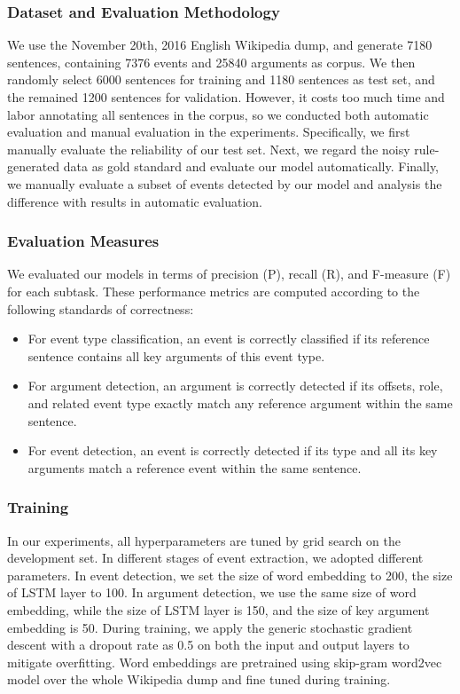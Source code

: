 \documentclass{article}
\begin{document}
\subsubsection{Dataset and Evaluation Methodology}
We use the November 20th, 2016 English Wikipedia dump, and generate 7180 sentences, containing 7376 events and 25840 arguments as corpus. We then randomly select 6000 sentences for training and 1180 sentences as test set, and the remained 1200 sentences for validation. However, it costs too much time and labor annotating all sentences in the corpus, so we conducted both automatic evaluation and manual evaluation in the experiments. Specifically, we first manually evaluate the reliability of our test set. Next, we regard the noisy rule-generated data as gold standard and evaluate our model automatically. Finally, we manually evaluate a subset of events detected by our model and analysis the difference with results in automatic evaluation.

\subsubsection{Evaluation Measures}
We evaluated our models in terms of precision (P), recall (R), and F-measure (F) for each subtask. These performance metrics are computed according to the following standards of correctness:

\begin{itemize}
	\item For event type classification, an event is correctly classified if its reference sentence contains all key arguments of this event type.
	\item For argument detection, an argument is correctly detected if its offsets, role, and related event type exactly match any reference argument within the same sentence.
	\item For event detection, an event is correctly detected if its type and all its key arguments match a reference event within the same sentence.
\end{itemize}

\subsubsection{Training}
In our experiments, all hyperparameters are tuned by grid search on the development set. In different stages of event extraction, we adopted different parameters. In event detection, we set the size of word embedding to 200, the size of LSTM layer to 100. In argument detection, we use the same size of word embedding, while the size of LSTM layer is 150, and the size of key argument embedding is 50.
During training, we apply the generic stochastic gradient descent \cite{bottou2010large} with a dropout rate as 0.5 on both the input and output layers to mitigate overfitting. Word embeddings are pretrained using skip-gram word2vec model \cite{mikolov2013distributed} over the whole Wikipedia dump and fine tuned during training. 
\end{document}
